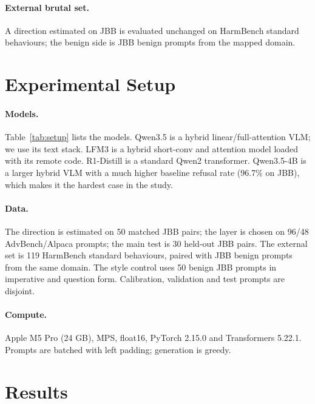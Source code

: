 \documentclass[twoside,11pt]{article}
\begin{document}
\paragraph{External brutal set.} A direction estimated on JBB is evaluated unchanged
on HarmBench standard behaviours; the benign side is JBB benign prompts from the
mapped domain.

\section{Experimental Setup}

\paragraph{Models.} Table~\ref{tab:setup} lists the models. Qwen3.5 is a hybrid
linear/full-attention VLM; we use its text stack. LFM3 is a hybrid short-conv and
attention model loaded with its remote code. R1-Distill is a standard Qwen2
transformer. Qwen3.5-4B is a larger hybrid VLM with a much higher baseline refusal
rate (96.7\% on JBB), which makes it the hardest case in the study.

\begin{table}[t]
\centering
\small
\caption{Models. All four models are evaluated; Qwen3.5-4B is the high-refusal
case.}
\label{tab:setup}

\end{table}

\paragraph{Data.} The direction is estimated on 50 matched JBB pairs; the layer is
chosen on 96/48 AdvBench/Alpaca prompts; the main test is 30 held-out JBB pairs. The
external set is 119 HarmBench standard behaviours, paired with JBB benign prompts
from the same domain. The style control uses 50 benign JBB prompts in imperative and
question form. Calibration, validation and test prompts are disjoint.

\paragraph{Compute.} Apple M5 Pro (24 GB), MPS, float16, PyTorch 2.15.0 and
Transformers 5.22.1. Prompts are batched with left padding; generation is greedy.

\section{Results}
\end{document}
